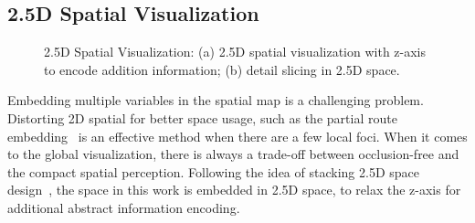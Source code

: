 \iffalse
\subsection{2.5D Spatial Visualization}
\label{subsec:25D}

\begin{figure}[htb!]
\centering
{}\hspace{5pt}
\hspace{5pt}
\caption{2.5D Spatial Visualization: (a) 2.5D spatial visualization with z-axis to encode addition information; (b) detail slicing in 2.5D space.}
\label{fig:2.5D}
\end{figure}


Embedding multiple variables in the spatial map is a challenging problem. Distorting 2D spatial for better space usage, such as the partial route embedding~\citep{sun2016embedding} is an effective method when there are a few local foci. When it comes to the global visualization, there is always a trade-off between occlusion-free and the compact spatial perception. Following the idea of stacking 2.5D space design~\citep{Tominski2012_stacking}, the space in this work is embedded in 2.5D space, to relax the z-axis for additional abstract information encoding.

